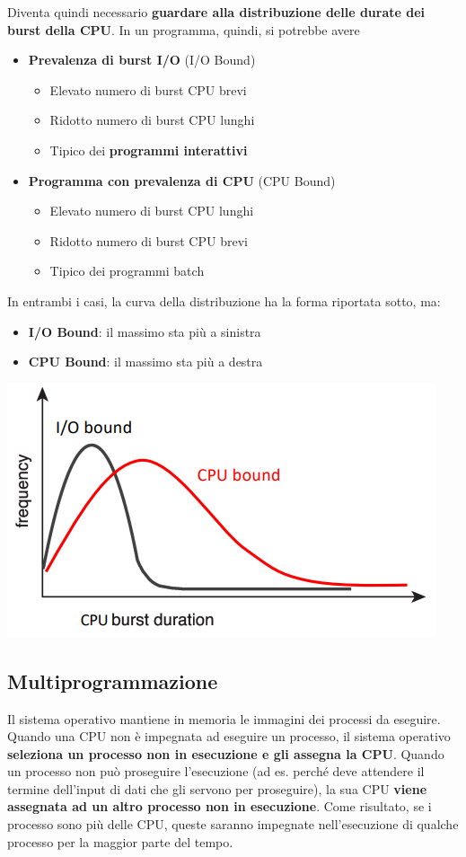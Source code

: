 \documentclass[12pt]{article}
\begin{document}
Diventa quindi necessario \textbf{guardare alla distribuzione delle durate dei burst della CPU}.
In un programma, quindi, si potrebbe avere
\begin{itemize}
    \item \textbf{Prevalenza di burst I/O} (I/O Bound)
    \begin{itemize}
        \item Elevato numero di burst CPU brevi
        \item Ridotto numero di burst CPU lunghi
        \item Tipico dei \textbf{programmi interattivi}
    \end{itemize}
    \item \textbf{Programma con prevalenza di CPU} (CPU Bound)
    \begin{itemize}
        \item Elevato numero di burst CPU lunghi
        \item Ridotto numero di burst CPU brevi
        \item Tipico dei programmi batch
    \end{itemize}
\end{itemize}
In entrambi i casi, la curva della distribuzione ha la forma riportata sotto, ma:
\begin{itemize}
    \item \textbf{I/O Bound}: il massimo sta più a sinistra
    \item \textbf{CPU Bound}: il massimo sta più a destra
\end{itemize} 
\begin{center}
    \includegraphics[width = 0.58\linewidth]{Images/37.png}
\end{center}
\subsection{Multiprogrammazione}
Il sistema operativo mantiene in memoria le immagini dei processi da eseguire.
Quando una CPU non è impegnata ad eseguire un processo, il sistema operativo \textbf{seleziona un processo non in esecuzione e gli assegna la CPU}.
Quando un processo non può proseguire l'esecuzione (ad es. perché deve attendere il termine dell'input di dati che gli servono per proseguire), la sua CPU
\textbf{viene assegnata ad un altro processo non in esecuzione}.
Come risultato, se i processo sono più delle CPU, queste saranno impegnate nell'esecuzione di qualche processo per la maggior parte del tempo.
\end{document}
